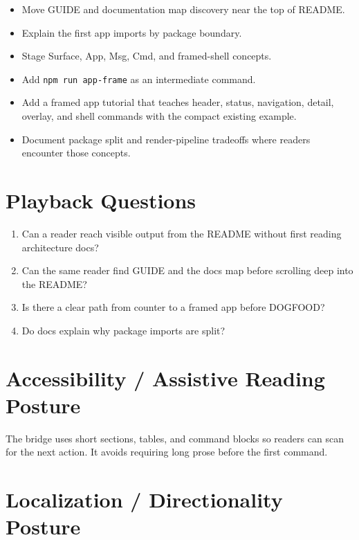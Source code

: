 \begin{itemize}
\tightlist
\item
  Move GUIDE and documentation map discovery near the top of README.
\item
  Explain the first app imports by package boundary.
\item
  Stage Surface, App, Msg, Cmd, and framed-shell concepts.
\item
  Add \texttt{n\allowbreak{}p\allowbreak{}m\allowbreak{} \allowbreak{}r\allowbreak{}u\allowbreak{}n\allowbreak{} \allowbreak{}a\allowbreak{}p\allowbreak{}p\allowbreak{}-\allowbreak{}f\allowbreak{}r\allowbreak{}a\allowbreak{}m\allowbreak{}e} as an intermediate command.
\item
  Add a framed app tutorial that teaches header, status, navigation, detail, overlay, and shell commands with the compact existing example.
\item
  Document package split and render-pipeline tradeoffs where readers encounter those concepts.
\end{itemize}

\section{Playback Questions}\label{record-148-playback-questions}

\begin{enumerate}
\def\labelenumi{\arabic{enumi}.}
\tightlist
\item
  Can a reader reach visible output from the README without first reading architecture docs?
\item
  Can the same reader find GUIDE and the docs map before scrolling deep into the README?
\item
  Is there a clear path from counter to a framed app before DOGFOOD?
\item
  Do docs explain why package imports are split?
\end{enumerate}

\section{Accessibility / Assistive Reading Posture}\label{record-148-accessibility-assistive-reading-posture}

The bridge uses short sections, tables, and command blocks so readers can scan for the next action. It avoids requiring long prose before the first command.

\section{Localization / Directionality Posture}\label{record-148-localization-directionality-posture}

